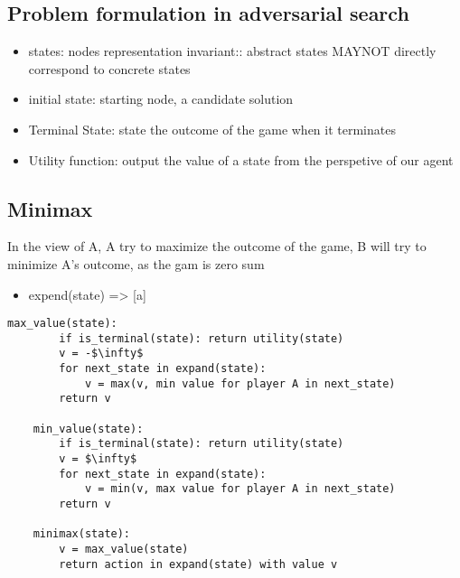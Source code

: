 \documentclass{article}
\begin{document}
\subsection{Problem formulation in adversarial search}
        \begin{itemize}
            \item states: nodes representation invariant:: abstract states MAYNOT directly correspond to concrete states
            \item initial state: starting node, a candidate solution
            \item Terminal State: state the outcome of the game when it terminates
            \item Utility function: output the value of a state from the perspetive of our agent 
        \end{itemize}

\subsection{Minimax}
In the view of A, A try to maximize the outcome of the game, B will try to minimize A's outcome, as the gam is zero sum\newline
\begin{itemize}
    \item expend(state) => [a]
    

\end{itemize}
\begin{lstlisting}[mathescape=true]
    max_value(state):
        if is_terminal(state): return utility(state)
        v = -$\infty$
        for next_state in expand(state):
            v = max(v, min value for player A in next_state)
        return v
    
    min_value(state):
        if is_terminal(state): return utility(state)
        v = $\infty$
        for next_state in expand(state):
            v = min(v, max value for player A in next_state)
        return v

    minimax(state): 
        v = max_value(state)
        return action in expand(state) with value v
\end{lstlisting}
\end{document}
